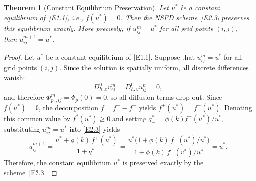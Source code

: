 \documentclass[final,12pt,3p]{elsarticle}
\theoremstyle{plain}
\newtheorem{theorem}{Theorem}
\theoremstyle{definition}
\theoremstyle{remark}
\begin{document}
\begin{theorem}[Constant Equilibrium Preservation]\label{T2}
Let $u^*$ be a constant equilibrium of~\eqref{E1.1}, i.e., $f(u^*)=0$.
Then the NSFD scheme~\eqref{E2.3} preserves this equilibrium exactly. 
More precisely, if $u_{ij}^m = u^*$ for all grid points $(i,j)$, then $u_{ij}^{m+1} = u^*$.
\end{theorem}
\begin{proof}
Let $u^*$ be a constant equilibrium of \eqref{E1.1}.
Suppose that $u_{ij}^m = u^*$ for all grid points $(i,j)$.
Since the solution is spatially uniform, all discrete differences vanish:
\begin{equation*}
    D_{h,x}^0 u_{ij}^m = D_{h,y}^0 u_{ij}^m = 0,
\end{equation*}
and therefore 
   $\Phi_{p,,ij}^m = \Phi_p(0) = 0$,
so all diffusion terms drop out.
Since $f(u^*) = 0$, the decomposition $f = f^+ - f^-$ yields $f^+(u^*) = f^-(u^*)$.
Denoting this common value by $f^*(u^*) \ge0$ and setting $q_-^* = \phi(k) f^-(u^*)/u^*$, substituting $u_{ij}^m = u^*$ into \eqref{E2.3} yields
\begin{equation*}
u_{ij}^{m+1} = \frac{u^* + \phi(k)\,f^+(u^*)}{1 + q_-^*}
= \frac{u^*\bigl(1 + \phi(k)\,f^-(u^*)/u^*\bigr)}{1 + \phi(k)\,f^-(u^*)/u^*}
= u^*.
\end{equation*}
Therefore, the constant equilibrium $u^*$ is preserved exactly by the scheme~\eqref{E2.3}.
\end{proof}

\end{document}
